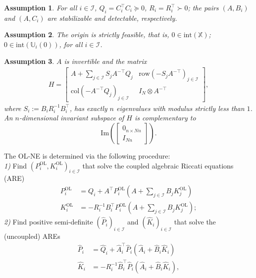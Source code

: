 \documentclass[letterpaper, 10 pt, conference]{ieeeconf}  %
\newcommand{\mc}{\mathcal}
\newcommand{\col}{\mathrm{col}}
\newcommand{\Pol}{P^{\mathrm{OL}}}
\newcommand{\Kol}{K^{\mathrm{OL}}}
\newcommand{\X}{\mathbb{X}}
\newcommand{\U}{\mathbb{U}}
\newcommand{\tsum}{\textstyle\sum}
\newtheorem{assumption}{Assumption}
\begin{document}
\begin{assumption} \label{as:objective_system} For all $i \in \mc I$, $Q_i=C_i^{\top}C_i \succeq 0$, $R_i = R_i^{\top}\succ 0$; the pairs $(A,B_i)$ and $(A,C_i)$ are stabilizable and detectable, respectively.
\end{assumption}
\begin{assumption}  \label{as:strict_feasibility} The origin is strictly feasible, that is,
    $0\in\mathrm{int}(\X)$; $0\in\mathrm{int}(\U_i(0))$, for all $i \in \mc I$.
\end{assumption}
\begin{assumption} \cite[Assumption 4.9]{monti2024feedback} \label{as:symplectic_matrix}
    $A$ is invertible and the matrix
    \begin{align*}
        H = \begin{bmatrix}
            A + \sum_{j\in\mc I}S_jA^{-\top}Q_j & \mathrm{row}(-S_jA^{-\top})_{j\in\mc I} \\
            \col(-A^{-\top}Q_j)_{j\in\mc I} & I_N \otimes A^{-\top}
        \end{bmatrix},
    \end{align*}
    where $S_i:=B_iR_i^{-1}B_i^{\top}$, has exactly $n$ eigenvalues with modulus strictly less than $1$. An $n$-dimensional invariant subspace of $H$ is complementary to
    \begin{equation*}
        \mathrm{Im}\left( \begin{bmatrix}0_{n\times Nn} \\ I_{Nn} \end{bmatrix} \right).
    \end{equation*}
\end{assumption}
The OL-NE is determined via the following procedure: \\
\emph{1)} Find $(\Pol_i, \Kol_i)_{i\in\mc I}$ that solve the coupled algebraic Riccati equations (ARE) \cite[Eq. 9]{freiling_discrete-time_1999}
\begin{align}
    \Pol_i &= Q_i + A^\top\Pol_i(A +\tsum_{j\in\mc I}B_j \Kol_j) \\
    \Kol_i &= -R_i^{-1}B_i^{\top}\Pol_i(A +\tsum_{j\in\mc I}B_j \Kol_j);
\end{align}
\emph{2)} Find positive semi-definite $(\hat{P}_i)_{i\in\mc I}$ and $(\hat{K}_i)_{i\in\mc I}$ that solve the (uncoupled) AREs \cite[Eq. 15]{benenati2024linear}
\begin{subequations}
    \begin{align}
        \hat{P}_i &= \hat{Q}_i + \hat{A}_i^\top\hat{P}_i(\hat{A}_i+\hat{B}_i \hat{K}_i)\\
        \hat{K}_i &= -R_i^{-1}\hat{B}_i^{\top}\hat{P}_i(\hat{A}_i +\hat{B}_i \hat{K}_i),
    \end{align}
\end{subequations}
\end{document}
